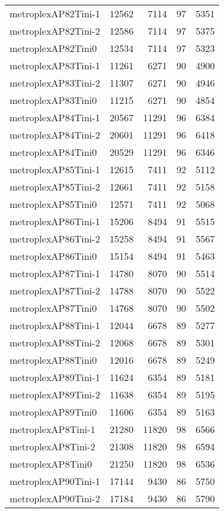\documentclass[../../../thesis.tex]{subfiles}
\begin{document}
\begin{longtable}{lrrrr}
metroplexAP82Tini-1 & 12562 & 7114 & 97 & 5351 \\
metroplexAP82Tini-2 & 12586 & 7114 & 97 & 5375 \\
metroplexAP82Tini0 & 12534 & 7114 & 97 & 5323 \\
metroplexAP83Tini-1 & 11261 & 6271 & 90 & 4900 \\
metroplexAP83Tini-2 & 11307 & 6271 & 90 & 4946 \\
metroplexAP83Tini0 & 11215 & 6271 & 90 & 4854 \\
metroplexAP84Tini-1 & 20567 & 11291 & 96 & 6384 \\
metroplexAP84Tini-2 & 20601 & 11291 & 96 & 6418 \\
metroplexAP84Tini0 & 20529 & 11291 & 96 & 6346 \\
metroplexAP85Tini-1 & 12615 & 7411 & 92 & 5112 \\
metroplexAP85Tini-2 & 12661 & 7411 & 92 & 5158 \\
metroplexAP85Tini0 & 12571 & 7411 & 92 & 5068 \\
metroplexAP86Tini-1 & 15206 & 8494 & 91 & 5515 \\
metroplexAP86Tini-2 & 15258 & 8494 & 91 & 5567 \\
metroplexAP86Tini0 & 15154 & 8494 & 91 & 5463 \\
metroplexAP87Tini-1 & 14780 & 8070 & 90 & 5514 \\
metroplexAP87Tini-2 & 14788 & 8070 & 90 & 5522 \\
metroplexAP87Tini0 & 14768 & 8070 & 90 & 5502 \\
metroplexAP88Tini-1 & 12044 & 6678 & 89 & 5277 \\
metroplexAP88Tini-2 & 12068 & 6678 & 89 & 5301 \\
metroplexAP88Tini0 & 12016 & 6678 & 89 & 5249 \\
metroplexAP89Tini-1 & 11624 & 6354 & 89 & 5181 \\
metroplexAP89Tini-2 & 11638 & 6354 & 89 & 5195 \\
metroplexAP89Tini0 & 11606 & 6354 & 89 & 5163 \\
metroplexAP8Tini-1 & 21280 & 11820 & 98 & 6566 \\
metroplexAP8Tini-2 & 21308 & 11820 & 98 & 6594 \\
metroplexAP8Tini0 & 21250 & 11820 & 98 & 6536 \\
metroplexAP90Tini-1 & 17144 & 9430 & 86 & 5750 \\
metroplexAP90Tini-2 & 17184 & 9430 & 86 & 5790 \\

\end{longtable}
\end{document}
